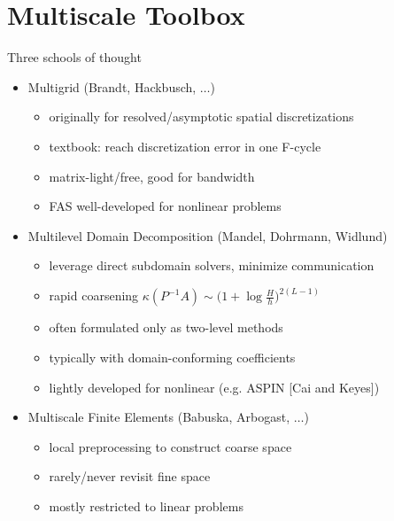 \documentclass{beamer}
\begin{document}
\section{Multiscale Toolbox}
\begin{frame}{Three schools of thought}
  \begin{itemize}
  \item Multigrid (Brandt, Hackbusch, $\dotsc$)
    \begin{itemize}
    \item originally for resolved/asymptotic spatial discretizations
    \item textbook: reach discretization error in one F-cycle
    \item matrix-light/free, good for bandwidth
    \item FAS well-developed for nonlinear problems
    \end{itemize}
  \item Multilevel Domain Decomposition (Mandel, Dohrmann, Widlund)
    \begin{itemize}
    \item leverage direct subdomain solvers, minimize communication
    \item rapid coarsening $\kappa(P^{-1}A) \sim \big(1 + \log \frac H h \big)^{2(L-1)}$
    \item often formulated only as two-level methods
    \item typically with domain-conforming coefficients
    \item lightly developed for nonlinear (e.g. ASPIN [Cai and Keyes])
    \end{itemize}
  \item Multiscale Finite Elements (Babuska, Arbogast, $\dotsc$)
    \begin{itemize}
    \item local preprocessing to construct coarse space
    \item rarely/never revisit fine space
    \item mostly restricted to linear problems
    \end{itemize}
  \end{itemize}
\end{frame}
\end{document}
